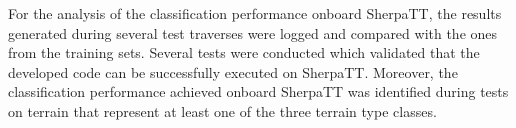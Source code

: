 \documentclass{article}
\begin{document}

For the analysis of the classification performance onboard SherpaTT, the results generated during several test traverses were logged and compared with the ones from the training sets.
Several tests were conducted which validated that the developed code can be successfully executed on SherpaTT.
Moreover, the classification performance achieved onboard SherpaTT was identified during tests on terrain that represent at least one of the three terrain type classes.




\end{document}
